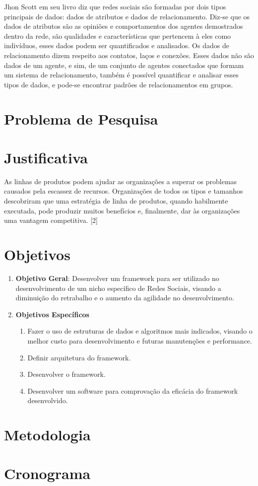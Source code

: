 Jhon Scott em seu livro \cite{Scott:Carrington:2011} diz que redes sociais são formadas por dois tipos principais de dados: dados de atributos e dados de relacionamento. Diz-se que os dados de atributos são as opiniões e comportamentos dos agentes demostrados dentro da rede, são qualidades e características que pertencem à eles como indivíduos, esses dados podem ser quantificados e analisados. Os dados de relacionamento dizem respeito aos contatos, laços e conexões. Esses dados não são dados de um agente, e sim, de um conjunto de agentes conectados que formam um sistema de relacionamento, também é possível quantificar e analisar esses tipos de dados, e pode-se encontrar padrões de relacionamentos em grupos.

\newpage
\section*{Problema de Pesquisa}

\section*{Justificativa}

As linhas de produtos podem ajudar as organizações a superar os problemas causados pela escassez de recursos. Organizações de todos os tipos e tamanhos descobriram que uma estratégia de linha de produtos, quando habilmente executada, pode produzir muitos benefícios e, finalmente, dar às organizações uma vantagem competitiva. [2]

\section*{Objetivos}

\begin{enumerate}
	\item \textbf{Objetivo Geral}: Desenvolver um framework para ser utilizado no desenvolvimento de um nicho específico de Redes Sociais, visando a diminuição do retrabalho e o aumento da agilidade no desenvolvimento.

	\item \textbf{Objetivos Específicos}
	\begin{enumerate}
		\item Fazer o uso de estruturas de dados e algoritmos mais indicados, visando o melhor custo para desenvolvimento e futuras manutenções e performance.
		\item Definir arquitetura do framework.
		\item Desenvolver o framework.
		\item Desenvolver um software para comprovação da eficácia do framework desenvolvido.
	\end{enumerate}
\end{enumerate}

\section*{Metodologia}

\section*{Cronograma}

\postextual

 


